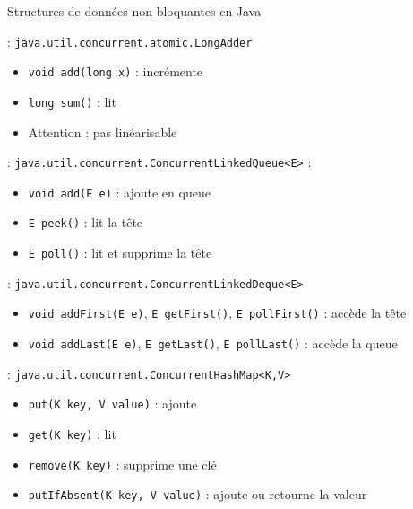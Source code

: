 
\begingroup

\begin{frame}{Structures de données non-bloquantes en Java}

   : \lstinline{java.util.concurrent.atomic.LongAdder}
  \begin{itemize}
  \item\vspace{-.5mm} \lstinline{void add(long x)} : incrémente
  \item\vspace{-.5mm} \lstinline{long sum()} : lit
  \item\vspace{-.5mm} \alert{Attention : pas linéarisable}
  \end{itemize}


  \vspace{1mm}
   : \lstinline{java.util.concurrent.ConcurrentLinkedQueue<E>} :
  \begin{itemize}
  \item\vspace{-.5mm} \lstinline{void add(E e)} : ajoute en queue
  \item\vspace{-.5mm} \lstinline{E peek()} : lit la tête
  \item\vspace{-.5mm} \lstinline{E poll()} : lit et supprime la tête
  \end{itemize}

  \vspace{1mm}
   : \lstinline{java.util.concurrent.ConcurrentLinkedDeque<E>}
  \begin{itemize}
  \item\vspace{-.5mm} \lstinline{void addFirst(E e)}, \lstinline{E getFirst()}, \lstinline{E pollFirst()} : accède la tête
  \item\vspace{-.5mm} \lstinline{void addLast(E e)}, \lstinline{E getLast()}, \lstinline{E pollLast()} : accède la queue
  \end{itemize}

  \vspace{1mm}
   : \lstinline{java.util.concurrent.ConcurrentHashMap<K,V>}
  \begin{itemize}
  \item\vspace{-.5mm} \lstinline{put(K key, V value)} : ajoute
  \item\vspace{-.5mm} \lstinline{get(K key)} : lit
  \item\vspace{-.5mm} \lstinline{remove(K key)} : supprime une clé
  \item\vspace{-.5mm} \lstinline{putIfAbsent(K key, V value)} : ajoute ou retourne la valeur
  \end{itemize}

\end{frame}

\endgroup
\endinput
